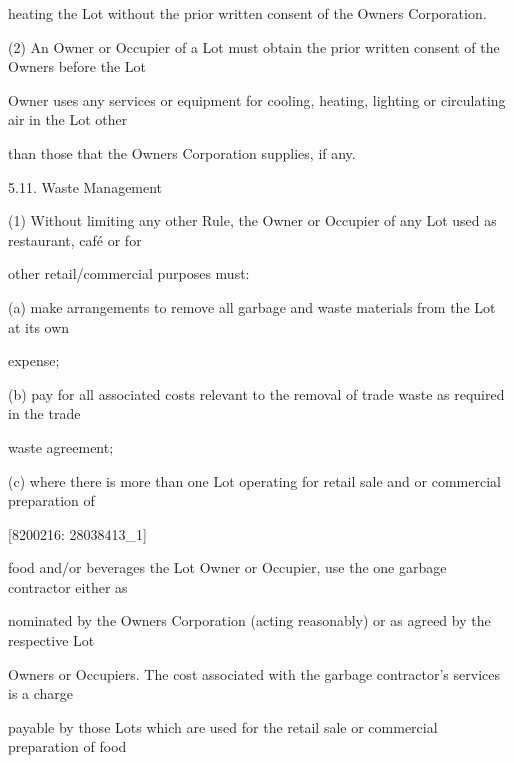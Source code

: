 \documentclass{article}
\begin{document}
{\fontsize{10.02}{1}heating the Lot without the prior written consent of the Owners Corporation. }

{\fontsize{9.962}{1}(2) An Owner or Occupier of a Lot must obtain the prior written consent of the Owners before the Lot }

{\fontsize{10.02}{1}Owner uses any services or equipment for cooling, heating, lighting or circulating air in the Lot other }

{\fontsize{10.02}{1}than those that the Owners Corporation supplies, if any. }

{\fontsize{9.99}{1}5.11. Waste Management }

{\fontsize{9.962}{1}(1) Without limiting any other Rule, the Owner or Occupier of any Lot used as restaurant, café or for }

{\fontsize{10.02}{1}other retail/commercial purposes must: }

{\fontsize{9.962}{1}(a) make arrangements to remove all garbage and waste materials from the Lot at its own }

{\fontsize{10.02}{1}expense; }

{\fontsize{9.962}{1}(b) pay for all associated costs relevant to the removal of trade waste as required in the trade }

{\fontsize{10.02}{1}waste agreement; }

{\fontsize{9.962}{1}(c) where there is more than one Lot operating for retail sale and or commercial preparation of }

\newpage
















{\fontsize{7.02}{1}[8200216: 28038413\_1] }

{\fontsize{10.02}{1}food and/or beverages the Lot Owner or Occupier, use the one garbage contractor either as }

{\fontsize{10.02}{1}nominated by the Owners Corporation (acting reasonably) or as agreed by the respective Lot }

{\fontsize{10.02}{1}Owners or Occupiers. The cost associated with the garbage contractor’s services is a charge }

{\fontsize{10.02}{1}payable by those Lots which are used for the retail sale or commercial preparation of food }
\end{document}

